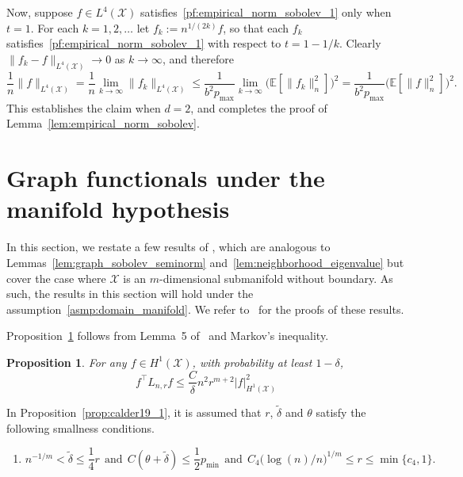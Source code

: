 \documentclass[twoside]{article}
\newcommand{\1}{\mathbf{1}}
\newcommand{\Lap}{L}
\newcommand{\Xset}{\mathcal{X}}
\newcommand{\Leb}{L}
\newcommand{\wt}[1]{\widetilde{#1}}
\newtheorem{proposition}{Proposition}
\theoremstyle{definition}
\theoremstyle{remark}
\begin{document}
Now, suppose $f \in \Leb^4(\Xset)$ satisfies~\eqref{pf:empirical_norm_sobolev_1} only when $t = 1$. For each $k = 1,2,\ldots$ let $f_k := n^{1/(2k)}f$, so that each $f_k$ satisfies~\eqref{pf:empirical_norm_sobolev_1} with respect to $t = 1 - 1/k$. Clearly $\|f_k - f\|_{\Leb^4(\Xset)} \to 0$ as $k \to \infty$, and therefore
\begin{equation*}
\frac{1}{n}\|f\|_{\Leb^4(\Xset)} = \frac{1}{n}\lim_{k \to \infty} \|f_k\|_{\Leb^4(\Xset)} \leq \frac{1}{b^2p_{\max}} \lim_{k \to \infty} \bigl(\mathbb{E}[\|f_k\|_n^2]\bigr)^2 =  \frac{1}{b^2p_{\max}}\bigl(\mathbb{E}[\|f\|_n^2]\bigr)^2.
\end{equation*}
This establishes the claim when $d = 2$, and completes the proof of Lemma~\ref{lem:empirical_norm_sobolev}.

\section{Graph functionals under the manifold hypothesis}
\label{sec:manifold}
In this section, we restate a few results of \citet{trillos2019,calder2019}, which are analogous to Lemmas~\ref{lem:graph_sobolev_seminorm} and~\ref{lem:neighborhood_eigenvalue} but cover the case where $\Xset$ is an $m$-dimensional submanifold without boundary. As such, the results in this section will hold under the assumption~\ref{asmp:domain_manifold}. We refer to~\citet{trillos2019,calder2019} for the proofs of these results.

Proposition~\ref{prop:garciatrillos19_1} follows from Lemma~5 of~\citet{trillos2019} and Markov's inequality.
\begin{proposition}
	\label{prop:garciatrillos19_1}
	For any $f \in H^1(\Xset)$, with probability at least $1 - \delta$,
	\begin{equation*}
	f^{\top} \Lap_{n,r} f \leq \frac{C}{\delta} n^2 r^{m + 2} |f|_{H^1(\Xset)}^2
	\end{equation*}
\end{proposition}

In Proposition~\ref{prop:calder19_1}, it is assumed that $r$, $\wt{\delta}$ and $\theta$ satisfy the following smallness conditions.
\begin{enumerate}[label=(S\arabic*)]
	\item 
	\setcounter{enumi}{1}
	\begin{equation*}
	n^{-1/m} < \wt{\delta} \leq \frac{1}{4}r~~\textrm{and}~~C(\theta + \wt{\delta}) \leq \frac{1}{2}p_{\min}~~\textrm{and}~~C_4\bigl(\log(n)/n\bigr)^{1/m}\leq r \leq\min\{c_4,1\}.
	\end{equation*}
\end{enumerate}
\end{document}
